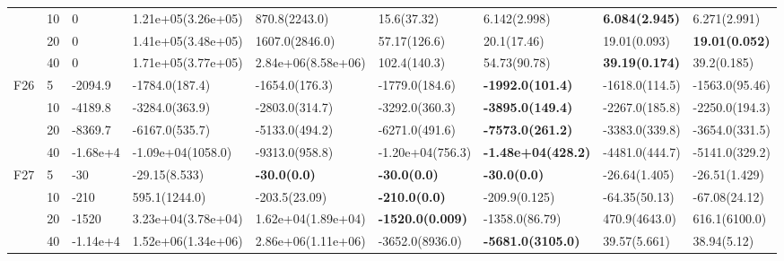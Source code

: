 \begin{longtable}{|l|l|l|l|l|l|l|l|l|}
\cmidrule{2-9} & 10  & 0        & 1.21e+05(3.26e+05)            & 870.8(2243.0)               & 15.6(37.32)             & 6.142(2.998)              & \textbf{6.084(2.945)}  & 6.271(2.991)          \\
\cmidrule{2-9} & 20  & 0        & 1.41e+05(3.48e+05)            & 1607.0(2846.0)              & 57.17(126.6)            & 20.1(17.46)               & 19.01(0.093)           & \textbf{19.01(0.052)} \\
\cmidrule{2-9} & 40  & 0        & 1.71e+05(3.77e+05)            & 2.84e+06(8.58e+06)          & 102.4(140.3)            & 54.73(90.78)              & \textbf{39.19(0.174)}  & 39.2(0.185)           \\ \hline
F26            & 5   & -2094.9  & -1784.0(187.4)                & -1654.0(176.3)              & -1779.0(184.6)          & \textbf{-1992.0(101.4)}   & -1618.0(114.5)         & -1563.0(95.46)        \\
\cmidrule{2-9} & 10  & -4189.8  & -3284.0(363.9)                & -2803.0(314.7)              & -3292.0(360.3)          & \textbf{-3895.0(149.4)}   & -2267.0(185.8)         & -2250.0(194.3)        \\
\cmidrule{2-9} & 20  & -8369.7  & -6167.0(535.7)                & -5133.0(494.2)              & -6271.0(491.6)          & \textbf{-7573.0(261.2)}   & -3383.0(339.8)         & -3654.0(331.5)        \\
\cmidrule{2-9} & 40  & -1.68e+4 & -1.09e+04(1058.0)             & -9313.0(958.8)              & -1.20e+04(756.3)        & \textbf{-1.48e+04(428.2)} & -4481.0(444.7)         & -5141.0(329.2)        \\ \hline
F27            & 5   & -30      & -29.15(8.533)                 & \textbf{-30.0(0.0)}         & \textbf{-30.0(0.0)}     & \textbf{-30.0(0.0)}       & -26.64(1.405)          & -26.51(1.429)         \\
\cmidrule{2-9} & 10  & -210     & 595.1(1244.0)                 & -203.5(23.09)               & \textbf{-210.0(0.0)}    & -209.9(0.125)             & -64.35(50.13)          & -67.08(24.12)         \\
\cmidrule{2-9} & 20  & -1520    & 3.23e+04(3.78e+04)            & 1.62e+04(1.89e+04)          & \textbf{-1520.0(0.009)} & -1358.0(86.79)            & 470.9(4643.0)          & 616.1(6100.0)         \\
\cmidrule{2-9} & 40  & -1.14e+4 & 1.52e+06(1.34e+06)            & 2.86e+06(1.11e+06)          & -3652.0(8936.0)         & \textbf{-5681.0(3105.0)}  & 39.57(5.661)           & 38.94(5.12)           \\ \hline

\end{longtable}

